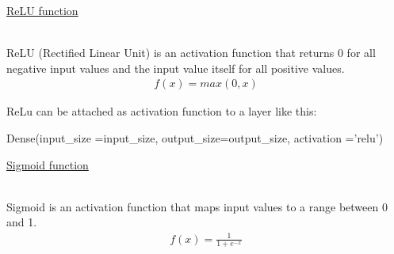 \documentclass{article}
\begin{document}
    \hypertarget{relu}{\underline{ReLU function}} \\
    
    ReLU (Rectified Linear Unit) is an activation function that returns 0 for all 
    negative input values and the input value itself for all 
    positive values. \\

    \begin{align*}
        f(x) = max(0, x)
    \end{align*}
    \begin{center}
    \end{center}

    ReLu can be attached as activation function to a layer like this:
\begin{python}
Dense(input_size =input_size,
      output_size=output_size,
      activation ='relu')
\end{python}
    \pagebreak

    \hypertarget{sigmoid}{\underline{Sigmoid function}} \\

    Sigmoid is an activation function that maps input values 
    to a range between 0 and 1. \\

    \begin{align*}
        f(x) = \frac{1}{1 + e^{-x}}
    \end{align*}

    \begin{center}    
    \end{center}
\end{document}

